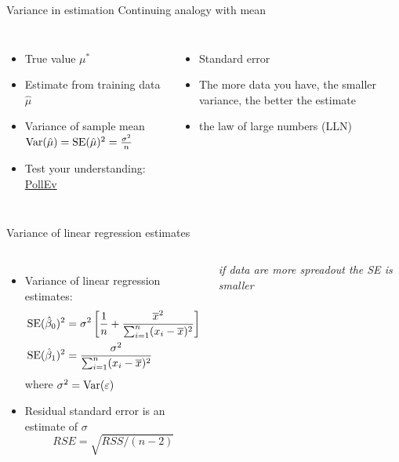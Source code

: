 \documentclass[aspectratio=169,usenames,dvipsnames]{beamer}
\newcommand{\InstructorNotes}[1]{\textit{\color{orange}#1}}
\newcommand{\InstructorList}[1]{
\begin{itemize}
	\color{orange}
	#1
\end{itemize}
}
\begin{document}
\begin{frame}[t]{Variance in estimation}
	{Continuing analogy with mean}

\begin{columns}
\centering

\begin{itemize}
	\item True value $\mu^*$
	\item Estimate from training data $\hat \mu$
	\item Variance of sample mean $\mathrm{Var}(\hat \mu) = \mathrm{SE}(\hat \mu)^2 = \frac{\sigma^2}{n}$
	\item Test your understanding: \href{https://PollEv.com/multiple_choice_polls/AxUWl4IGPoWbklyCdZy2Z/respond}{PollEv}
\end{itemize}
\InstructorList{
  \item Standard error 
  \item The more data you have, the smaller variance, the better the estimate 
  \item the law of large numbers (LLN)
}
\end{columns}

\end{frame}
\begin{frame}[t]{Variance of linear regression estimates }
\begin{columns}
\centering
\centering
\begin{itemize}
	\item Variance of linear regression estimates:
	\begin{align*}
		\mathrm{SE}(\hat \beta_0)^2
				&= \sigma^2 \left[ \frac{1}{n} + \frac{\overline x^2}{\sum_{i=1}^n (x_i - \overline x)^2}\right]\\
		\mathrm{SE}(\hat \beta_1)^2 &= \frac{\sigma^2}{\sum_{i=1}^n (x_i - \overline x)^2}
	\end{align*}
	where $\sigma^2 = \mathrm{Var}(\varepsilon)$
	\item Residual standard error is an estimate of $\sigma$
	\begin{equation*}
		RSE = \sqrt{RSS/ (n-2)}
	\end{equation*}
\end{itemize}
\centering
\InstructorNotes{if data are more spreadout the SE is smaller}

\end{columns}
\end{frame}
\end{document}
